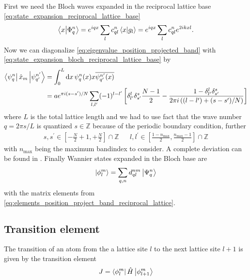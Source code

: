 First we need the Bloch waves expanded in the reciprocal lattice base
\cref{eq:state_expansion_reciprocal_lattice_base}
\begin{equation}
  \bra{x}\ket{\Phi^n_q}
  =e^{iqx}\sum_lc^n_{ql}\bra{x}\ket{g_l}
  =e^{iqx}\sum_lc^n_{ql}e^{2ikxl}
  \label{eq:state_expansion_bloch_reciprocal_lattice_base}.
\end{equation}
Now we can diagonalize \cref{eq:eigenvalue_position_projected_band} with
\cref{eq:state_expansion_bloch_reciprocal_lattice_base} by
\begin{align}
  \bra{\psi^n_{q}}\hat{x}_m\ket{\psi^{n^\prime}_{q^\prime}}
  &=\int_0^L\dd{x}\psi^n_{q}(x)x\overline{\psi^{n^\prime}_{q^\prime}(x)}\\
  &=ae^{\pi i(s-s^\prime)/N}\sum_{l,l^\prime}(-1)^{l-l^\prime}\left[
    \delta^l_{l^\prime}\delta^s_{s^\prime}\frac{N-1}{2}-
    \frac{1-\delta^l_{l^\prime}\delta^s_{s^\prime}}{2\pi i\left((l-l^\prime)+(s-s^\prime)/N\right)}
  \right]
  \label{eq:eigenvalue_position_project_band_reciprocal_lattice_base}
\end{align}
where $L$ is the total lattice length and we had to use fact that the wave
number $q=2\pi s/L$ is quantized $s\in\mathbb{Z}$ because of the periodic
boundary condition, further
\begin{align}
  s,s^\prime\in\left[-\frac{N}{2}+1,+\frac{N}{2}\right]\cap\mathbb{Z}
  &&
  l,l^\prime\in\left[\frac{1-n_\text{max}}{2},\frac{n_\text{max}-1}{2}\right]
  \cap\mathbb{Z}
\end{align}
with $n_\text{max}$ being the maximum bandindex to consider. A complete
deviation can be found in \cite{Bissbort2013}. Finally Wannier states
expanded in the Bloch base are
\begin{equation}
  \ket{\phi^m_l}
  =\sum_{q,n}d^{nm}_{ql}\ket{\Psi^n_q}
  \label{eq:state_expansion_wannier_in_bloch_base}
\end{equation}
with the matrix elements from
\cref{eq:elements_position_project_band_reciprocal_lattice}.

\subsection{Transition element}

The transition of an atom from the a lattice site $l$ to the next lattice site
$l+1$ is given by the transition element
\begin{equation}
  J
  =\bra{\phi^m_l}\hat{H}\ket{\phi^m_{l+1}}
\end{equation}

